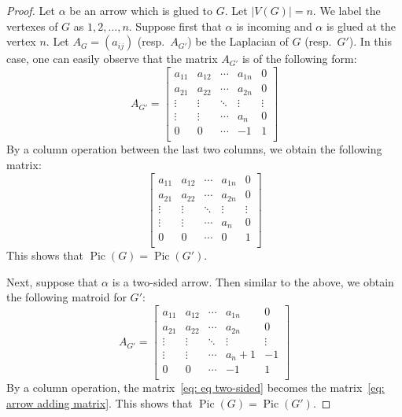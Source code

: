 \documentclass[11pt,reqno]{amsart}
\DeclareMathOperator{\Pic}{Pic}
\theoremstyle{definition}
\theoremstyle{plain}
\begin{document}
	\begin{proof}
		Let $\alpha$ be an arrow which is glued to $G$. Let $|V(G)|=n$. We label the vertexes of
		$G$ as $1,2,\dots,n$. Suppose first that $\alpha$ is incoming and $\alpha$ is glued at the vertex $n$.
		Let $A_G=(a_{ij})$ (resp.~$A_{G'}$) be the Laplacian of $G$ (resp.~$G'$). In this case, one can easily
		observe that the matrix $A_{G'}$ is of the following form:
		\begin{equation}
			A_{G'}=\left[\begin{array}{ccc|c|c}
				a_{11}&a_{12}&\cdots &a_{1n}&0\\
				a_{21}&a_{22}&\cdots &a_{2n}&0\\
				\vdots & \vdots &\ddots & \vdots & \vdots \\ \hline
					\vdots & \vdots & \cdots&a_n & 0\\ \hline
				0&0&\cdots &-1&1\\
			\end{array}\right]
		\end{equation}
		By a column operation between the last two columns, we obtain the following matrix:
		\begin{equation}\label{eq: arrow adding matrix}
			\left[\begin{array}{ccc|c|c}
				a_{11}&a_{12}&\cdots &a_{1n}&0\\
				a_{21}&a_{22}&\cdots &a_{2n}&0\\
				\vdots & \vdots &\ddots & \vdots & \vdots \\ \hline
				\vdots & \vdots & \cdots&a_n & 0\\ \hline
				0&0&\cdots &0&1\\
			\end{array}\right]
		\end{equation}
		This shows that $\Pic(G)=\Pic(G')$.

		Next, suppose that $\alpha$ is a two-sided arrow. Then similar to the above, we obtain the following matroid for $G'$:
		\begin{equation}\label{eq: eq two-sided}
			A_{G'}=\left[\begin{array}{ccc|c|c}
				a_{11}&a_{12}&\cdots &a_{1n}&0\\
				a_{21}&a_{22}&\cdots &a_{2n}&0\\
				\vdots & \vdots &\ddots & \vdots & \vdots \\ \hline
				\vdots & \vdots & \cdots&a_n+1 & -1\\ \hline
				0&0&\cdots &-1&1\\
			\end{array}\right]
		\end{equation}
		By a column operation, the matrix~\eqref{eq: eq two-sided} becomes the matrix~\eqref{eq: arrow adding matrix}.
		This shows that $\Pic(G)=\Pic(G')$.
	\end{proof}
\end{document}
